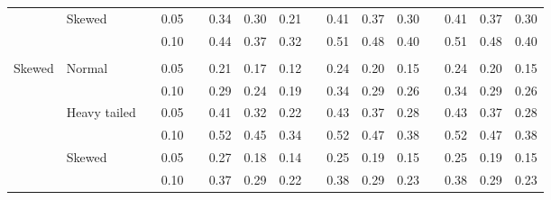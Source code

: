 \documentclass{article} %
\begin{document}
\begin{table}[ht]
\begin{scriptsize}
\begin{center}
\begin{tabular}{ll p{.1cm} c p{.1cm} rrr p{.1cm} rrr p{.1cm} rrr}
             & Skewed       && 0.05 &&  0.34 & 0.30 & 0.21 && 0.41 & 0.37 & 0.30 && 0.41 & 0.37 & 0.30 \\ 
             &              && 0.10 &&  0.44 & 0.37 & 0.32 && 0.51 & 0.48 & 0.40 && 0.51 & 0.48 & 0.40 \\ 
             &&&&&&&&&&&&&&&\\
Skewed       & Normal       && 0.05 &&  0.21 & 0.17 & 0.12 && 0.24 & 0.20 & 0.15 && 0.24 & 0.20 & 0.15 \\ 
             &              && 0.10 &&  0.29 & 0.24 & 0.19 && 0.34 & 0.29 & 0.26 && 0.34 & 0.29 & 0.26 \\ 
             & Heavy tailed && 0.05 &&  0.41 & 0.32 & 0.22 && 0.43 & 0.37 & 0.28 && 0.43 & 0.37 & 0.28 \\ 
             &              && 0.10 &&  0.52 & 0.45 & 0.34 && 0.52 & 0.47 & 0.38 && 0.52 & 0.47 & 0.38 \\ 
             & Skewed       && 0.05 &&  0.27 & 0.18 & 0.14 && 0.25 & 0.19 & 0.15 && 0.25 & 0.19 & 0.15 \\ 
             &              && 0.10 &&  0.37 & 0.29 & 0.22 && 0.38 & 0.29 & 0.23 && 0.38 & 0.29 & 0.23 \\ 




\end{tabular}
\end{center}
\end{scriptsize}
\end{table}
\end{document}
